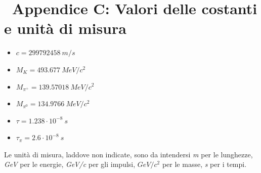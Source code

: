 \documentclass[8pt]{extarticle}
\begin{document}
\section{\ Appendice C: Valori delle costanti e unità di misura}

\begin{itemize}
\item $c = 299792458\ m/s$
\item $M_K = 493.677\ MeV/c^2$
\item $M_{\pi^{+}} = 139.57018\ MeV/c^2$
\item $M_{\pi^0} = 134.9766\ MeV/c^2$
\item $\tau = 1.238\cdot 10^{-8}\ s$
\item $\tau_\pi = 2.6\cdot 10^{-8}\ s$
\end{itemize}

Le unità di misura, laddove non indicate, sono da intendersi \textit{m} per le lunghezze, \textit{GeV} per le energie, \textit{GeV/c} per gli impulsi, \textit{$GeV/c^2$} per le masse, \textit{s} per i tempi.


\end{document}
